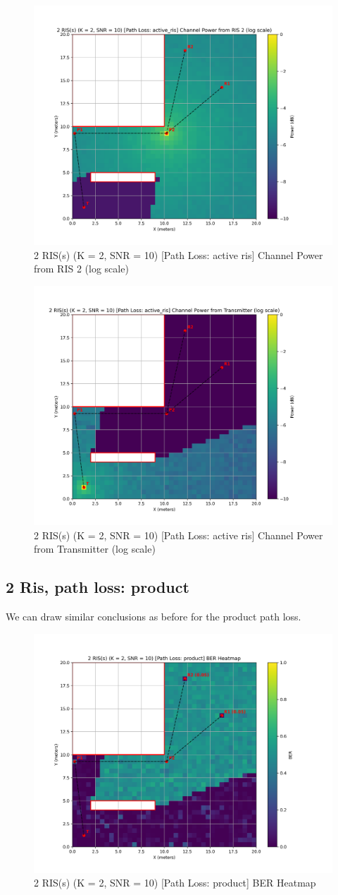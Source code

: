 \begin{figure}[H]
  \centering
  \includegraphics[width=0.45\linewidth]{imgs/heatmap-simulations/2 RIS(s) (K = 2, SNR = 10) [Path Loss_ active_ris] Channel Power from RIS 2 (log scale).png}
  \caption{2 RIS(s) (K = 2, SNR = 10) [Path Loss: active ris] Channel Power from RIS 2 (log scale)}
\end{figure}

\begin{figure}[H]
  \centering
  \includegraphics[width=0.45\linewidth]{imgs/heatmap-simulations/2 RIS(s) (K = 2, SNR = 10) [Path Loss_ active_ris] Channel Power from Transmitter (log scale).png}
  \caption{2 RIS(s) (K = 2, SNR = 10) [Path Loss: active ris] Channel Power from Transmitter (log scale)}
\end{figure}

\subsection*{2 Ris, path loss: product}
We can draw similar conclusions as before for the product path loss.

\begin{figure}[H]
  \centering
  \includegraphics[width=0.45\linewidth]{imgs/heatmap-simulations/2 RIS(s) (K = 2, SNR = 10) [Path Loss_ product] BER Heatmap.png}
  \caption{2 RIS(s) (K = 2, SNR = 10) [Path Loss: product] BER Heatmap}
\end{figure}

